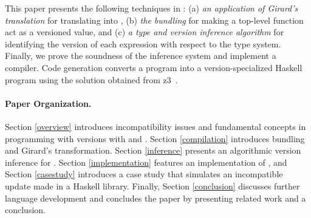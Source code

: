 This paper presents the following techniques in \mylang{}: (a) \emph{an application of Girard's translation} for translating \mylang{} into \vlmini{}, (b) \emph{the bundling} for making a top-level function act as a versioned value, and (c) \emph{a type and version inference algorithm} for identifying the version of each expression with respect to the \corelang{} type system. Finally, we prove the soundness of the inference system and implement a \mylang{} compiler. Code generation converts a \mylang{} program into a version-specialized Haskell program using the solution obtained from z3~\cite{10.1007/978-3-540-78800-3_24}.

\vspace{-0.5\baselineskip}
\paragraph{Paper Organization.}
Section \ref{overview} introduces incompatibility issues and fundamental concepts in programming with versions with \corelang{} and \mylang{}.
Section \ref{compilation} introduces bundling and Girard's transformation.
Section \ref{inference} presents an algorithmic version inference for \mylang{}.
Section \ref{implementation} features an implementation of \mylang{}, and Section \ref{casestudy} introduces a case study that simulates an incompatible update made in a Haskell library.
Finally, Section \ref{conclusion} discusses further language development and concludes the paper by presenting related work and a conclusion.